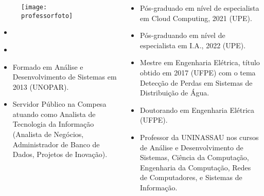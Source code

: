 \begin{frame}[t]

    \begin{columns}

        \begin{column}{0.5\linewidth}
            \small
            \begin{figure}[htb]
                \centering{}
                \texttt{[image: \\professorfoto]}

                \textbf{\href{\professorlattes}{\professor}}
            \end{figure}
            \begin{itemize}
                \justifying{}
                \setlength\itemsep{1em}
                \item \href{\professorsite}{\professorsite}
                \item \href{\professorlattes}{\professorlattes}
                \item Formado em Análise e Desenvolvimento de Sistemas em 2013 (UNOPAR).
                \item Servidor Público na Compesa atuando como Analista de Tecnologia da Informação (Analista de Negócios, Administrador de Banco de Dados, Projetos de Inovação).
            \end{itemize}
        \end{column}

        \begin{column}{0.5\linewidth}
            \small
            \begin{itemize}
                \justifying{}
                \setlength\itemsep{1em}
                \item Pós-graduado em nível de especialista em Cloud Computing, 2021 (UPE).
                \item Pós-graduando em nível de especialista em I.A., 2022 (UPE).
                \item Mestre em Engenharia Elétrica, título obtido em 2017 (UFPE) com o tema Detecção de Perdas em Sistemas de Distribuição de Água.
                \item Doutorando em Engenharia Elétrica (UFPE).
                \item Professor da UNINASSAU nos cursos de Análise e Desenvolvimento de Sistemas, Ciência da Computação, Engenharia da Computação, Redes de Computadores, e Sistemas de Informação.
            \end{itemize}
        \end{column}

    \end{columns}

\end{frame}
